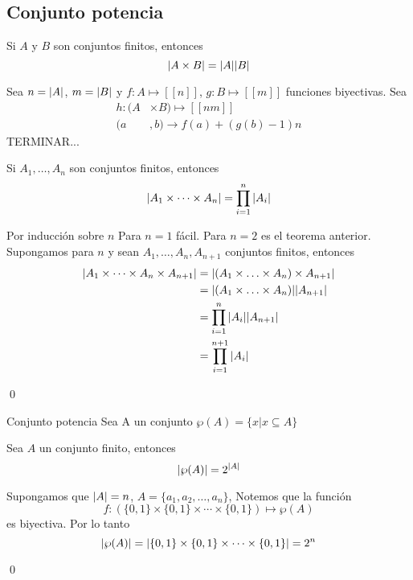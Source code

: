	\subsection{Conjunto potencia}
		\begin{theorem}{}
			Si $A$ y $B$ son conjuntos finitos, entonces
			$$\abs{A\times B}=\abs{A}\abs{B}$$
		\end{theorem}
		\begin{demostration}{}
			Sea $n=\abs{A}$, $m=\abs{B}$ y $f:A\longmapsto [[n]]$, $g:B\longmapsto [[m]]$ funciones biyectivas. Sea
			\begin{align*}
				h:(A&\times B)\longmapsto[[nm]] \\
				(a&,b)\longrightarrow f(a)+(g(b)-1)n
			\end{align*}
			TERMINAR...
		\end{demostration}
		\begin{corollary}{}
			Si $A_1,\dotso,A_n$ son conjuntos finitos, entonces 
			$$\abs{A_1\times\dotsb\times A_n}=\prod_{i=1}^{n}{\abs{A_i}}$$
		\end{corollary}
		\begin{demostration}{}
			Por inducción sobre $n$
			Para $n=1$ fácil.
			Para $n=2$ es el teorema anterior.
			Supongamos para $n$ y sean $A_1,\dotso,A_n,A_{n+1}$ conjuntos finitos, entonces
			\begin{align*}
				\abs{A_1\times\dotsb\times A_n\times A_{n+1}}&=\abs{(A_1\times\dotso\times A_n)\times A_{n+1}} \\
				&=\abs{(A_1\times\dotso\times A_n)}\abs{A_{n+1}}\\
				&=\prod_{i=1}^{n}{\abs{A_i}}\abs{A_{n+1}}\\
				&=\prod_{i=1}^{n+1}{\abs{A_i}}
			\end{align*}
			\begin{flushright}
				\qed
			\end{flushright}
		\end{demostration}
		\begin{definition}{Conjunto potencia}
			Sea A un conjunto $\wp(A)=\{x|x\subseteq A\}$ 
		\end{definition}
		\begin{theorem}{}
			Sea $A$ un conjunto finito, entonces
			$$\abs{\wp(A)}=2^{\abs{A}}$$
		\end{theorem}
		\begin{demostration}{}
			
			Supongamos que $\abs{A}=n$, $A=\{a_1,a_2,\dotso,a_n\}$, Notemos que la función $$f:(\{0,1\}\times\{0,1\}\times\dotsb\times\{0,1\})\longmapsto\wp(A)$$ es biyectiva. Por lo tanto $$\abs{\wp(A)}=\abs{\{0,1\}\times\{0,1\}\times\dotsb\times\{0,1\}}=2^n$$
			\begin{flushright}
				\qed
			\end{flushright}
		\end{demostration}
